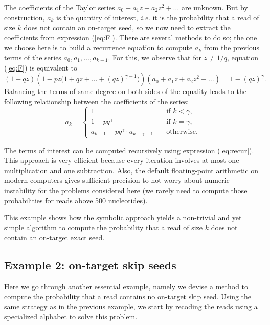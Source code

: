 \documentclass{article}
\begin{document}
The coefficients of the Taylor series $a_0 + a_1z + a_2z^2 + \ldots$ are
unknown. But by construction, $a_k$ is the quantity of interest,
\textit{i.e.} it is the probability that a read of size $k$ does not
contain an on-target seed, so we now need to extract the coefficients
from expression (\ref{eq:F}). There are several methods to do so; the one
we choose here is to build a recurrence equation to compute $a_k$ from the
previous terms of the series $a_0, a_1, \ldots, a_{k-1}$. For this, we
observe that for $z \neq 1/q$, equation (\ref{eq:F}) is equivalent to
\begin{equation*}
(1-qz) \left(1-pz \big(1+qz+\ldots+(qz)^{\gamma-1} \big)\right)
(a_0 + a_1z +a_2z^2 + \ldots) = 1-(qz)^\gamma.
\end{equation*}
Balancing the terms of same degree on both sides of the equality leads
to the following relationship between the coefficients of the series:
\begin{equation}
\label{eq:recur}
a_k = 
\begin{cases}
1            &\quad\text{if } k < \gamma, \\
1 -pq^\gamma &\quad\text{if } k = \gamma, \\
a_{k-1} -pq^\gamma \cdot a_{k-\gamma-1} &\quad\text{otherwise.}
\end{cases}
\end{equation}

The terms of interest can be computed recursively using expression
(\ref{eq:recur}). This approach is very efficient because every iteration
involves at most one multiplication and one subtraction. Also, the default
floating-point arithmetic on modern computers gives sufficient precision
to not worry about numeric instability for the problems considered here
(we rarely need to compute those probabilities for reads above 500
nucleotides).

This example shows how the symbolic approach yields a non-trivial and yet
simple algorithm to compute the probability that a read of size $k$ does
not contain an on-target exact seed.


\subsection{Example 2: on-target skip seeds}
\label{sec:example_skip}

Here we go through another essential example, namely we devise a method to
compute the probability that a read contains no on-target skip seed. Using
the same strategy as in the previous example, we start by recoding the
reads using a specialized alphabet to solve this problem.
\end{document}
